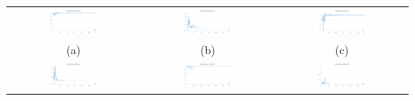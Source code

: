 \documentclass[a4paper]{article}
\begin{document}
\begin{table}[H]
  \centering
  \begin{tabular}{ccc}
    \includegraphics[width=0.4\textwidth]{mean-disc1-on-real-train.png} &
    \includegraphics[width=0.4\textwidth]{mean-disc1-on-fake-train.png} &
    \includegraphics[width=0.4\textwidth]{mean-disc1-on-real-val.png} \\
    (a) & (b) & (c) \\
    \includegraphics[width=0.4\textwidth]{mean-disc1-on-fake-val.png} &
    \includegraphics[width=0.4\textwidth]{mean-disc2-on-real-train.png} &
    \includegraphics[width=0.4\textwidth]{mean-disc2-on-fake-train.png} \\

\end{tabular}
\end{table}
\end{document}
